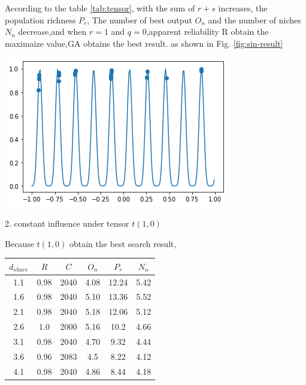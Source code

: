 \documentclass[smallextended]{svjour3}       %
\begin{document}
\begin{multicols}{2}
According to the table \ref{tab:tensor}, with the sum of $r+s$ increases, the population richness $P_r$,
The number of best output $O_n$ and the number of niches $N_n$ decrease,and 
when $r=1$ and $q=0$,apparent reliability R obtain the maximaize value,GA obtains the best result. 
as shown in Fig. \ref{fig:sin-result} 

\begin{center}
  \includegraphics[width=\linewidth]{GA_images/example-sin-result.png}
  \label{fig:sin-result}
\end{center}

2. constant influence under tensor $t(1,0)$

Because $t(1,0)$ obtain the best search result,

\begin{center}
\begin{tabular}{cccccc}
	\toprule
    $d_{share}$ & $R$ & $C$ & $O_{n}$ & $P_{r}$ & $N_{n}$\\
	\midrule
    1.1 & 0.98 & 2040 & 4.08 & 12.24 & 5.42 \\
    1.6 & 0.98 & 2040 & 5.10 & 13.36 & 5.52 \\
    2.1 & 0.98 & 2040 & 5.18 & 12.06 & 5.12 \\
    2.6 & 1.0  & 2000 & 5.16 & 10.2 & 4.66 \\
    3.1 & 0.98 & 2040 & 4.70 & 9.32 & 4.44 \\
    3.6 & 0.96 & 2083 & 4.5  & 8.22 & 4.12 \\
    4.1 & 0.98 & 2040 & 4.86 & 8.44 & 4.18 \\
	\bottomrule
\end{tabular}
\label{tab:d-share}
\end{center}


\end{multicols}
\end{document}
